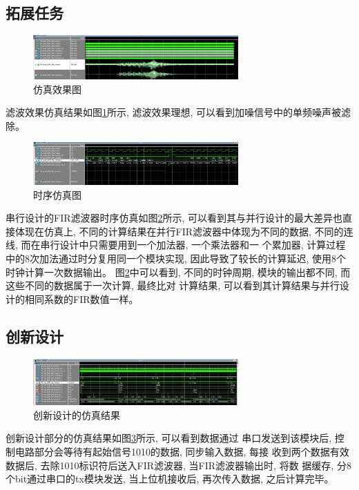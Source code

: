 \documentclass{article}
\begin{document}
\subsection*{拓展任务}
\begin{figure}[H]
    \centering
    \includegraphics[width=0.7\textwidth]{image/2024-06-27-02-14-26.png}
    \caption{仿真效果图}
    \label{image_extend_sim_1}
\end{figure}
滤波效果仿真结果如图\ref{image_extend_sim_1}所示, 滤波效果理想, 可以看到加噪信号中的单频噪声被滤除。
\begin{figure}[H]
    \centering
    \includegraphics[width=0.7\textwidth]{image/2024-06-27-02-15-54.png}
    \caption{时序仿真图}
    \label{image_extend_sim_2}
\end{figure}

串行设计的FIR滤波器时序仿真如图\ref{image_extend_sim_2}所示, 可以看到其与并行设计的最大差异也直接体现在仿真上, 
不同的计算结果在并行FIR滤波器中体现为不同的数据, 不同的连线, 而在串行设计中只需要用到一个加法器, 一个乘法器和一
个累加器, 计算过程中的8次加法通过时分复用同一个模块实现, 因此导致了较长的计算延迟, 使用8个时钟计算一次数据输出。
图\ref{image_extend_sim_2}中可以看到, 不同的时钟周期, 模块的输出都不同, 而这些不同的数据属于一次计算, 最终比对
计算结果, 可以看到其计算结果与并行设计的相同系数的FIR数值一样。
\subsection*{创新设计}
\begin{figure}[H]
    \centering
    \includegraphics[width=0.7\textwidth]{image/2024-06-27-22-24-29.png}
    \caption{创新设计的仿真结果}
    \label{image_innovation_sim_1}
\end{figure}
创新设计部分的仿真结果如图\ref{image_innovation_sim_1}所示, 可以看到数据通过
串口发送到该模块后, 控制电路部分会等待有起始信号1010的数据, 同步输入数据, 每接
收到两个数据有效数据后, 去除1010标识符后送入FIR滤波器, 当FIR滤波器输出时, 将数
据缓存, 分8个bit通过串口的tx模块发送, 当上位机接收后, 再次传入数据, 之后计算完毕。
\end{document}
